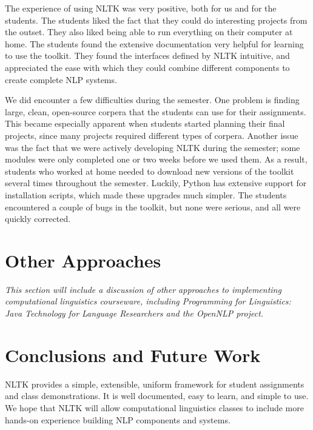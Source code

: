 \documentclass[11pt]{article}
\begin{document}
The experience of using NLTK was very positive, both for us and for
the students.  The students liked the fact that they could do
interesting projects from the outset.  They also liked being able to
run everything on their computer at home.  The students found the
extensive documentation very helpful for learning to use the toolkit.
They found the interfaces defined by NLTK intuitive, and appreciated
the ease with which they could combine different components to create
complete NLP systems.

We did encounter a few difficulties during the semester.  One problem
is finding large, clean, open-source corpera that the students can use
for their assignments.  This became especially apparent when students
started planning their final projects, since many projects required
different types of corpera.  Another issue was the fact that we were
actively developing NLTK during the semester; some modules were only
completed one or two weeks before we used them.  As a result, students
who worked at home needed to download new versions of the toolkit
several times throughout the semester.  Luckily, Python has extensive
support for installation scripts, which made these upgrades much
simpler.  The students encountered a couple of bugs in the toolkit,
but none were serious, and all were quickly corrected.

%

\section{Other Approaches}
\label{sec:approaches}

\textit{This section will include a discussion of other approaches to
implementing computational linguistics courseware, including
\emph{Programming for Linguistics: Java Technology for Language
Researchers}\cite{Hammond02} and \emph{the OpenNLP project}\cite{opennlp}.}

\section{Conclusions and Future Work}
\label{sec:conclusion}

NLTK provides a simple, extensible, uniform framework for student
assignments and class demonstrations.  It is well documented, easy to
learn, and simple to use.  We hope that NLTK will allow computational
linguistics classes to include more hands-on experience building NLP
components and systems.
\end{document}
